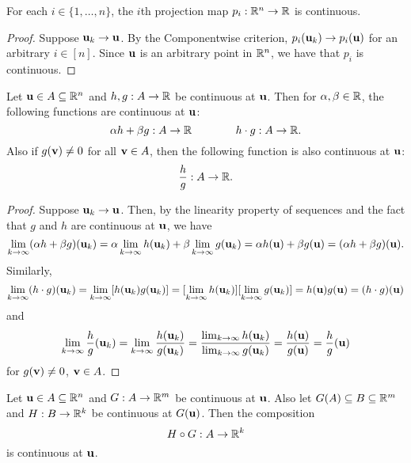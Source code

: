 \documentclass[letterpaper, twoside, 12pt]{book}
\begin{document}
\begin{proposition}[11.1]
  For each \(i\in\{1,\dots,n\}\), the \(i\)th projection map
  \(p_i:\mathbb R^n\to\mathbb R\) is continuous.
\end{proposition}

\begin{proof}
    Suppose \(\mathbf u_k \to \mathbf u\). By the Componentwise
    criterion, \(p_i(\mathbf u_k) \to p_i(\mathbf u)\) for an 
    arbitrary \(i \in [n]\). Since \(\mathbf u\) is an arbitrary
    point in \(\mathbb R^n\), we have that \(p_i\) is continuous.
\end{proof}

\begin{theorem}[11.3]
  Let \(\mathbf u\in A\subseteq \mathbb R^n\) and \(h,g:A\to\mathbb R\) be continuous
  at \(\mathbf u\). Then for \(\alpha,\beta\in\mathbb R\), the following functions
  are continuous at \(\mathbf u\):
  \[
    \alpha h+\beta g : A\to\mathbb R
      \hspace{4em}
    h\cdot g : A\to\mathbb R
  .\]
  Also if \(g(\mathbf v)\not=0\) for all \(\mathbf v\in A\), then the following
  function is also continuous at \(\mathbf u\):
  \[
    \frac{h}{g} : A\to\mathbb R
  .\]
\end{theorem}

\begin{proof}
    Suppose \(\mathbf u_k \to \mathbf u\). Then, by the linearity property of 
    sequences and the fact that \(g\) and \(h\) are continuous at \(\mathbf u\), 
    we have
    \[ \lim_{k \to \infty} (\alpha h + \beta g)(\mathbf u_k) = 
    \alpha \lim_{k \to \infty} h(\mathbf u_k) + \beta \lim_{k \to \infty} g(\mathbf u_k) = 
    \alpha h(\mathbf u) + \beta g(\mathbf u) = (\alpha h + \beta g)(\mathbf u) .\]
    Similarly,
    \[ \lim_{k \to \infty} (h \cdot g)(\mathbf u_k) = 
       \lim_{k \to \infty} [h(\mathbf u_k) g(\mathbf u_k)] = 
       [\lim_{k \to \infty} h(\mathbf u_k)][\lim_{k \to \infty} g(\mathbf u_k)] = 
       h(\mathbf u)g(\mathbf u) = (h \cdot g)(\mathbf u) \]
    and
    \[ \lim_{k \to \infty} \frac{h}{g}(\mathbf u_k) = 
       \lim_{k \to \infty} \frac{h(\mathbf u_k)}{g(\mathbf u_k)} = 
       \frac{ \lim_{k \to \infty} h(\mathbf u_k) }{ \lim_{k \to \infty} g(\mathbf u_k) } =
       \frac{h(\mathbf u)}{g(\mathbf u)} =
       \frac{h}{g}(\mathbf u) \]
    for \(g(\mathbf v) \neq 0\), \(\mathbf v \in A\).
\end{proof}

\begin{theorem}[11.5]
  Let \(\mathbf u\in A\subseteq \mathbb R^n\) and \(G: A\to\mathbb R^m\) be continuous
  at \(\mathbf u\). Also let \(G(A)\subseteq B\subseteq \mathbb R^m\) and
  \(H:B\to\mathbb R^k\) be continuous at \(G(\mathbf u)\). Then the composition
  \[
    H\circ G : A\to\mathbb R^k
  \]
  is continuous at \(\mathbf u\).
\end{theorem}
\end{document}
